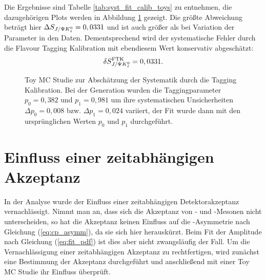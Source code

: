 Die Ergebnisse sind Tabelle \ref{tab:syst_fit_calib_toys} zu entnehmen, die dazugehörigen Plots werden in Abbildung \ref{fig:toys_tag_calib} gezeigt. Die größte Abweichung beträgt hier $\Delta S_{J/\Psi K_s^0} = 0,0331$ und ist auch größer als bei Variation der Parameter in den Daten. Dementsprechend wird der systematische Fehler durch die Flavour Tagging Kalibration mit ebendiesem Wert konservativ abgeschätzt:
\begin{align}
\delta S_{J/\Psi K_s^0}^{\text{FTK}} = 0,0331.
\end{align}
\begin{figure}[hptb]
\centering
{}
\caption{Toy MC Studie zur Abschätzung der Systematik durch die Tagging Kalibration. Bei der Generation wurden die Taggingparameter $p_0=0,382$ und $p_1=0,981$ um ihre systematischen Unsicherheiten $\Delta p_0 = 0,008$ bzw. $\Delta p_1 = 0,024$ variiert, der Fit wurde dann mit den ursprünglichen Werten $p_0$ und $p_1$ durchgeführt.}
\label{fig:toys_tag_calib}
\end{figure}

\section{Einfluss einer zeitabhängigen Akzeptanz} \label{kap:akzeptanz}
In der Analyse wurde der Einfluss einer zeitabhängigen Detektorakzeptanz vernachlässigt. Nimmt man an, dass sich die Akzeptanz von \Bd- und \Bdbar-Mesonen nicht unterscheiden, so hat die Akzeptanz keinen Einfluss auf die \CP-Asymmetrie nach Gleichung (\ref{eq:cp_asymm}), da sie sich hier herauskürzt. Beim Fit der Amplitude nach Gleichung (\ref{eq:fit_pdf}) ist dies aber nicht zwangsläufig der Fall. Um die Vernachlässigung einer zeitabhängigen Akzeptanz zu rechtfertigen, wird zunächst eine Bestimmung der Akzeptanz durchgeführt und anschließend mit einer Toy MC Studie ihr Einfluss überprüft.


